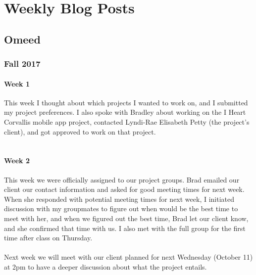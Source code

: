 \documentclass[onecolumn, draftclsnofoot,10pt, compsoc]{IEEEtran}
\begin{document}
\section{Weekly Blog Posts}
  \subsection{Omeed}
    \subsubsection{Fall 2017}
      \paragraph{Week 1}
      This week I thought about which projects I wanted to work on, and I submitted my project preferences. I also spoke with Bradley about working on the I Heart Corvallis mobile app project, contacted Lyndi-Rae Elisabeth Petty (the project's client), and got approved to work on that project. \\ \\

      \paragraph{Week 2}
      This week we were officially assigned to our project groups. Brad emailed our client our contact information and asked for good meeting times for next week. When she responded with potential meeting times for next week, I initiated discussion with my groupmates to figure out when would be the best time to meet with her, and when we figured out the best time, Brad let our client know, and she confirmed that time with us. I also met with the full group for the first time after class on Thursday. \\ \\
      Next week we will meet with our client planned for next Wednesday (October 11) at 2pm to have a deeper discussion about what the project entails. \\ \\
\end{document}
